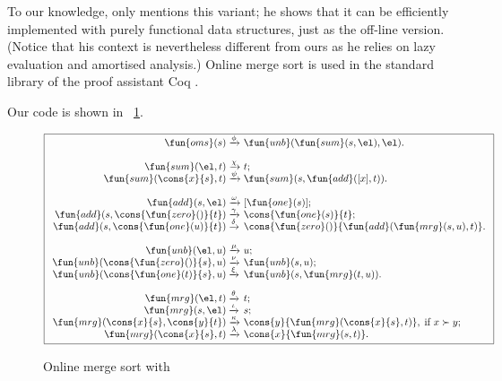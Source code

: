 To our knowledge, only \cite{Okasaki_1998a} mentions this variant; he
shows that it can be efficiently implemented with purely functional
data structures, just as the off\hyp{}line version. (Notice that his
context is nevertheless different from ours as he relies on lazy
evaluation and amortised analysis.) Online merge sort is used in the
standard library of the proof assistant 
\textsf{Coq} \citep{BertotCasteran_2004}.

Our code is shown in \fig~\ref{fig:oms}.
\begin{figure}
\begin{equation*}
\boxed{%
\begin{array}{r@{\;}l@{\;}l}
\fun{oms}(s)   & \xrightarrow{\smash{\phi}}
               & \fun{unb}(\fun{sum}(s,\el),\el).\\
\\
\fun{sum}(\el,t)         & \xrightarrow{\smash{\chi}} & t;\\
\fun{sum}(\cons{x}{s},t) & \xrightarrow{\smash{\psi}}
                         & \fun{sum}(s,\fun{add}([x],t)).\\
\\
\fun{add}(s,\el) & \xrightarrow{\smash{\omega}} & [\fun{one}(s)];\\
\fun{add}(s,\cons{\fun{zero}()}{t})
                    & \xrightarrow{\smash{\gamma}}
                    & \cons{\fun{one}(s)}{t};\\
\fun{add}(s,\cons{\fun{one}(u)}{t}) & \xrightarrow{\smash{\delta}}
                    & \cons{\fun{zero}()}{\fun{add}(\fun{mrg}(s,u),t)}.\\
\\
\fun{unb}(\el,u) & \xrightarrow{\smash{\mu}} & u;\\
\fun{unb}(\cons{\fun{zero}()}{s},u)
                 & \xrightarrow{\smash{\nu}} & \fun{unb}(s,u);\\
\fun{unb}(\cons{\fun{one}(t)}{s},u)
                 & \xrightarrow{\smash{\xi}}
                 & \fun{unb}(s,\fun{mrg}(t,u)).\\
\\
\fun{mrg}(\el,t)         & \xrightarrow{\smash{\theta}} & t;\\
\fun{mrg}(s,\el)         & \xrightarrow{\smash{\iota}} & s;\\
\fun{mrg}(\cons{x}{s},\cons{y}{t}) & \xrightarrow{\smash{\kappa}}
                         & \cons{y}{\fun{mrg}(\cons{x}{s},t)},\;
                           \text{if \(x \succ y\)};\\
\fun{mrg}(\cons{x}{s},t) & \xrightarrow{\smash{\lambda}}
                         & \cons{x}{\fun{mrg}(s,t)}.
\end{array}}
\end{equation*}
\caption{Online merge sort with }
\label{fig:oms}
\end{figure}
